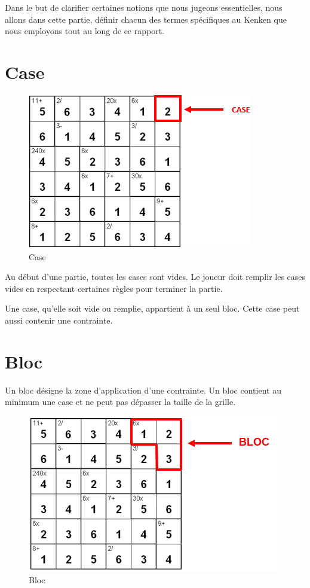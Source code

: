 \documentclass[1]{report}
\begin{document}
Dans le but de clarifier certaines notions que nous jugeons essentielles, nous allons dans cette partie, définir chacun des termes spécifiques au Kenken que nous employons tout au long de ce rapport.\par

    \section{Case}
    
    \begin{figure}[h]
    \centering
        \includegraphics[scale=0.9]{case.PNG}
        \caption{Case}
    \end{figure}
    
    Au début d’une partie, toutes les cases sont vides. Le joueur doit remplir les cases vides en respectant certaines règles pour terminer la partie.
    
    Une case, qu’elle soit vide ou remplie, appartient à un seul bloc. Cette case peut aussi contenir une contrainte.
    
    \section{Bloc}
  
    
    Un bloc désigne la zone d'application d'une contrainte. Un bloc contient au minimum une case et ne peut pas dépasser la taille de la grille.
    
    \begin{figure}[H]
    \centering
        \includegraphics[scale=0.5]{bloc.png}
        \caption{Bloc}
    \end{figure}  
    
\end{document}
